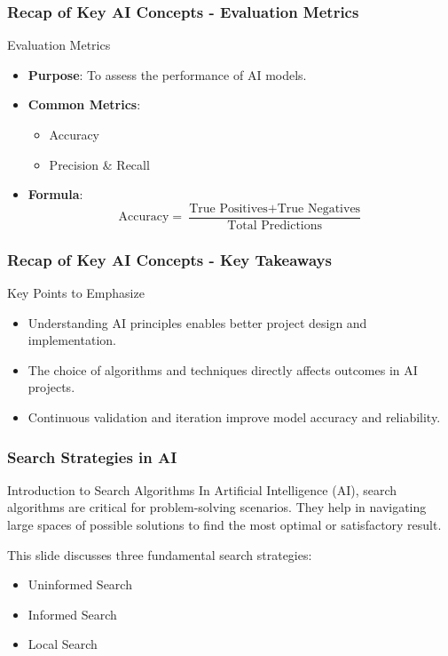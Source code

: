 \documentclass[aspectratio=169]{beamer}
\begin{document}
\begin{frame}[fragile]
    \frametitle{Recap of Key AI Concepts - Evaluation Metrics}
    \begin{block}{Evaluation Metrics}
        \begin{itemize}
            \item \textbf{Purpose}: To assess the performance of AI models.
            \item \textbf{Common Metrics}:
                \begin{itemize}
                    \item Accuracy
                    \item Precision \& Recall
                \end{itemize}
            \item \textbf{Formula}:
                \begin{equation}
                    \text{Accuracy} = \frac{\text{True Positives} + \text{True Negatives}}{\text{Total Predictions}}
                \end{equation}
        \end{itemize}
    \end{block}
\end{frame}

\begin{frame}[fragile]
    \frametitle{Recap of Key AI Concepts - Key Takeaways}
    \begin{block}{Key Points to Emphasize}
        \begin{itemize}
            \item Understanding AI principles enables better project design and implementation.
            \item The choice of algorithms and techniques directly affects outcomes in AI projects.
            \item Continuous validation and iteration improve model accuracy and reliability.
        \end{itemize}
    \end{block}
\end{frame}

\begin{frame}[fragile]
    \frametitle{Search Strategies in AI}
    
    \begin{block}{Introduction to Search Algorithms}
        In Artificial Intelligence (AI), search algorithms are critical for problem-solving scenarios. They help in navigating large spaces of possible solutions to find the most optimal or satisfactory result.
    \end{block}
    
    This slide discusses three fundamental search strategies:
    \begin{itemize}
        \item Uninformed Search
        \item Informed Search
        \item Local Search
    \end{itemize}
\end{frame}
\end{document}
